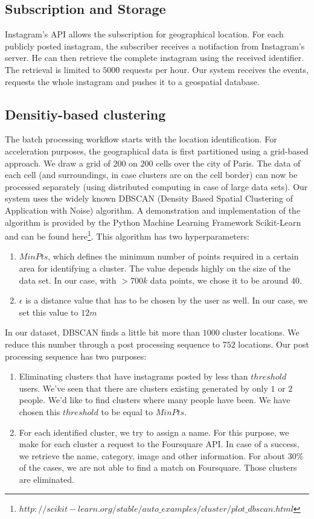 \subsection{Subscription and Storage}
Instagram's API allows the subscription for geographical location. For each publicly posted instagram, the subscriber receives a notifaction from Instagram's server. He can then retrieve the complete instagram using the received identifier. The retrieval is limited to $5000$ requests per hour. Our system receives the events, requests the whole instagram and pushes it to a geospatial database.

\subsection{Densitiy-based clustering}
\label{sec:dbscan}
The batch processing workflow starts with the location identification. For acceleration purposes, the geographical data is first partitioned using a grid-based approach. We draw a grid of $200$ on $200$ cells over the city of Paris. The data of each cell (and surroundings, in case clusters are on the cell border) can now be processed separately (using distributed computing in case of large data sets). Our system uses the widely known DBSCAN \cite{Ester96adensity-based} (Density Based Spatial Clustering of Application with Noise) algorithm. A demonstration and implementation of the algorithm is provided by the Python Machine Learning Framework Scikit-Learn \cite{scikit-learn} and can be found here\footnote{$http://scikit-learn.org/stable/auto\_examples/cluster/plot\_dbscan.html$}. This algorithm has two hyperparameters:
\begin{enumerate}
  \item $MinPts$, which defines the minimum number of points required in a certain area for identifying a cluster. The value depends highly on the size of the data set. In our case, with $>700k$ data points, we chose it to be around $40$.
  \item $\epsilon$ is a distance value that has to be chosen by the user as well. In our case, we set this value to $12m$
\end{enumerate}

In our dataset, DBSCAN finds a little bit more than $1000$ cluster locations. We reduce this number through a post processing sequence to $752$ locations. Our post processing sequence has two purposes:
\begin{enumerate}
  \item Eliminating clusters that have instagrams posted by less than $threshold$ users. We've seen that there are clusters existing generated by only $1$ or $2$ people. We'd like to find clusters where many people have been. We have chosen this $threshold$ to be equal to $MinPts$.
  \item For each identified cluster, we try to assign a name. For this purpose, we make for each cluster a request to the Foursquare API. In case of a success, we retrieve the name, category, image and other information. For about 30\% of the cases, we are not able to find a match on Foursquare. Those clusters are eliminated.
\end{enumerate}


